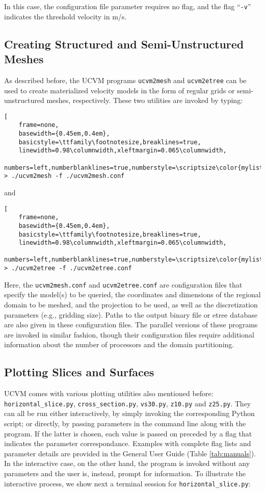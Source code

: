 \noindent
In this case, the configuration file parameter requires no flag, and the flag ``\texttt{-v}'' indicates the threshold velocity in m/s.

\subsection{Creating Structured and Semi-Unstructured Meshes}

As described before, the UCVM programs \texttt{ucvm2mesh} and \texttt{ucvm2etree} can be used to create materialized velocity models in the form of regular grids or semi-unstructured meshes, respectively. These two utilities are invoked by typing:

\begin{lstlisting}[
	frame=none,
	basewidth={0.45em,0.4em},
	basicstyle=\ttfamily\footnotesize,breaklines=true,
	linewidth=0.98\columnwidth,xleftmargin=0.065\columnwidth,
	numbers=left,numberblanklines=true,numberstyle=\scriptsize\color{mylistingnclr}]
> ./ucvm2mesh -f ./ucvm2mesh.conf
\end{lstlisting}

\noindent
and

\begin{lstlisting}[
	frame=none,
	basewidth={0.45em,0.4em},
	basicstyle=\ttfamily\footnotesize,breaklines=true,
	linewidth=0.98\columnwidth,xleftmargin=0.065\columnwidth,
	numbers=left,numberblanklines=true,numberstyle=\scriptsize\color{mylistingnclr}]
> ./ucvm2etree -f ./ucvm2etree.conf
\end{lstlisting}

\noindent
Here, the \texttt{ucvm2mesh.conf} and \texttt{ucvm2etree.conf} are configuration files that specify the model(s) to be queried, the coordinates and dimensions of the regional domain to be meshed, and the projection to be used, as well as the discretization parameters (e.g., gridding size). Paths to the output binary file or etree database are also given in these configuration files. The parallel versions of these programs are invoked in similar fashion, though their configuration files require additional information about the number of processors and the domain partitioning.

\subsection{Plotting Slices and Surfaces}

UCVM comes with various plotting utilities also mentioned before: \texttt{horizontal\_slice.py}, \texttt{cross\_section.py}, \texttt{vs30.py}, \texttt{z10.py} and \texttt{z25.py}. They can all be run either interactively, by simply invoking the corresponding Python script; or directly, by passing parameters in the command line along with the program. If the latter is chosen, each value is passed on preceded by a flag that indicates the parameter correspondance. Examples with complete flag lists and parameter details are provided in the General User Guide (Table \ref{tab:manuals}). In the interactive case, on the other hand, the program is invoked without any parameters and the user is, instead, prompt for information. To illustrate the interactive process, we show next a terminal session for \texttt{horizontal\_slice.py}:

